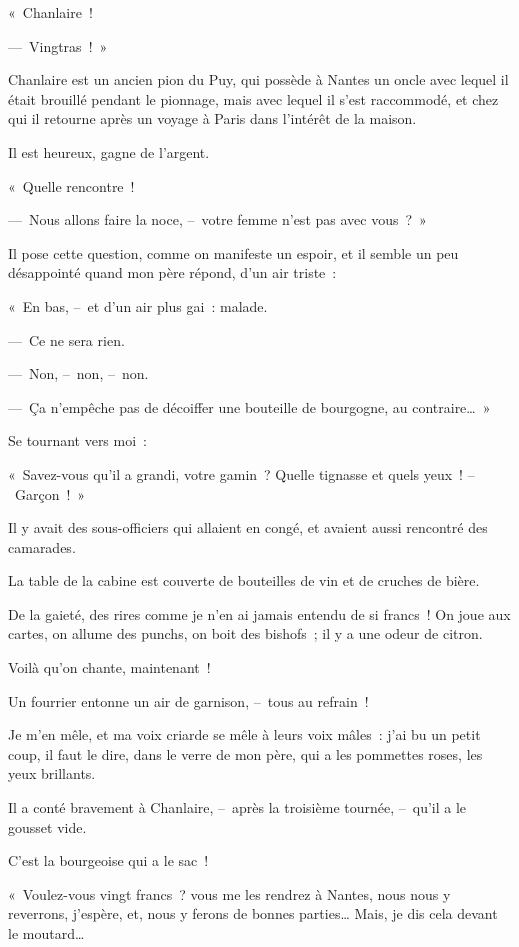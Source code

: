 \documentclass[french,twoside]{book} %
\def\mednobreak{\ifdim\lastskip<\medskipamount
  \removelastskip\nopagebreak\medskip\fi}
\newcommand{\labelblock}[1]{\medbreak{\noindent\color{rubric}\bfseries #1}\par\mednobreak}
\begin{document}
\labelblock{UNE RECONNAISSANCE}

\noindent « Chanlaire !\par
— Vingtras ! »\par
Chanlaire est un ancien pion du Puy, qui possède à Nantes un oncle avec lequel il était brouillé pendant le pionnage, mais avec lequel il s’est raccommodé, et chez qui il retourne après un voyage à Paris dans l’intérêt de la maison.\par
Il est heureux, gagne de l’argent.\par
« Quelle rencontre !\par
— Nous allons faire la noce, – votre femme n’est pas avec vous ? »\par
Il pose cette question, comme on manifeste un espoir, et il semble un peu désappointé quand mon père répond, d’un air triste :\par
« En bas, – et d’un air plus gai : malade.\par
— Ce ne sera rien.\par
— Non, – non, – non.\par
— Ça n’empêche pas de décoiffer une bouteille de bourgogne, au contraire… »\par
Se tournant vers moi :\par
« Savez-vous qu’il a grandi, votre gamin ? Quelle tignasse et quels yeux ! – Garçon ! »\par
\bigbreak
\noindent Il y avait des sous-officiers qui allaient en congé, et avaient aussi rencontré des camarades.\par
La table de la cabine est couverte de bouteilles de vin et de cruches de bière.\par
De la gaieté, des rires comme je n’en ai jamais entendu de si francs ! On joue aux cartes, on allume des punchs, on boit des bishofs ; il y a une odeur de citron.\par
Voilà qu’on chante, maintenant !\par
Un fourrier entonne un air de garnison, – tous au refrain !\par
Je m’en mêle, et ma voix criarde se mêle à leurs voix mâles : j’ai bu un petit coup, il faut le dire, dans le verre de mon père, qui a les pommettes roses, les yeux brillants.\par
Il a conté bravement à Chanlaire, – après la troisième tournée, – qu’il a le gousset vide.\par
C’est la bourgeoise qui a le sac !\par
« Voulez-vous vingt francs ? vous me les rendrez à Nantes, nous nous y reverrons, j’espère, et, nous y ferons de bonnes parties… Mais, je dis cela devant le moutard…\par
\end{document}
